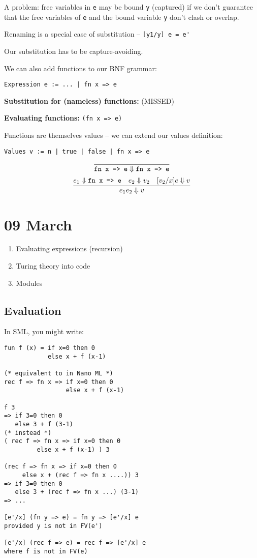 \documentclass[11pt]{article}
\begin{document}
A problem: free variables in \verb~e~ may be bound \verb~y~ (captured) if we don't guarantee that the free variables of \verb~e~ and the bound variable \verb~y~ don't clash or overlap. 

Renaming is a special case of substitution -- \verb~[y1/y] e = e'~

Our substitution has to be capture-avoiding.

We can also add functions to our BNF grammar:
\begin{verbatim}
Expression e := ... | fn x => e
\end{verbatim}

\textbf{Substitution for (nameless) functions:} (MISSED)

\textbf{Evaluating functions:} \verb~(fn x => e)~

Functions are themselves values -- we can extend our values definition:
\begin{verbatim}
Values v := n | true | false | fn x => e
\end{verbatim}

\[
    \infer{\verb~fn x => e~ \Downarrow \verb~fn x => e~}{}
\]
\[
    \infer{e_1 e_2 \Downarrow v}{
        e_1 \Downarrow \verb~fn x => e~
        &
        e_2 \Downarrow v_2
        &
        [v_2/x] e \Downarrow v
    }
\]

\section{09 March}
\begin{enumerate}
    \item Evaluating expressions (recursion)
    \item Turing theory into code
    \item Modules
\end{enumerate}

\subsection{Evaluation}
    
In SML, you might write:
\begin{verbatim}
fun f (x) = if x=0 then 0
            else x + f (x-1)

(* equivalent to in Nano ML *)
rec f => fn x => if x=0 then 0
                 else x + f (x-1)

f 3
=> if 3=0 then 0
   else 3 + f (3-1)
(* instead *)
( rec f => fn x => if x=0 then 0
         else x + f (x-1) ) 3

(rec f => fn x => if x=0 then 0
     else x + (rec f => fn x ....)) 3
=> if 3=0 then 0
   else 3 + (rec f => fn x ...) (3-1)
=> ...

[e'/x] (fn y => e) = fn y => [e'/x] e
provided y is not in FV(e')

[e'/x] (rec f => e) = rec f => [e'/x] e
where f is not in FV(e)
\end{verbatim}
\end{document}
